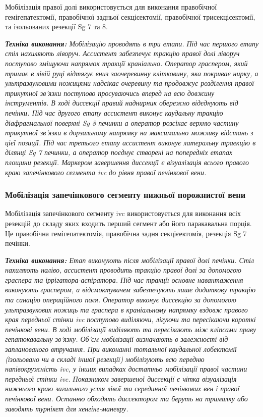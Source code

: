 \begin{refsection}
Мобілізація правої долі використовується для виконання правобічної гемігепатектомії, правобічної задньої секцієектомії, правобічної трисекцієектомії, та ізольованих резекції Sg 7 та 8.

\textit{ \textbf{Техніка виконання:} Мобілізацію проводять в три етапи. Під час першого етапу стіл нахиляють ліворуч. Ассистент забезпечує тракцію правої долі ліворуч поступово зміщуючи напрямок тракції краніально. Оператор граспером, який тримає в лівій руці відтягує вниз заочеревинну клітковину, яка покриває нирку, а ультразвуковими ножицями надсікає очеревину та продовжує розділення правої трикутної зв'язки поступово просуваючись вперед на всю довжину інструментів. В ході диссекції правий наднирник обережно відєднують від печінки. Під час другого етапу ассистент виконує каудальну тракцію діафрагмальної поверхні Sg 8 печинки а оператор розсікає верхню частину трикутної зв'язки в дорзальному напрямку на максимально можливу відстань з цієї позиції. Під час третього етапу ассистент виконує латеральну траекцію в ділянці Sg 7 печинки, а оператор поєднує створені на попередніх етапах площини резекції. Маркером завершення диссекції є візуалізація всього правого краю запечінкового сегмента \acrshort{ivc} до рівня правої печінкової вени.  
}

\subsubsection{Мобілізація запечінкового сегменту нижньої порожнистої вени}

Мобілізація запечінкового сегменту \acrshort{ivc} використовується для виконання всіх резекцій до складу яких входить перший сегмент або його паракавальна порція. Це правобічна гемігепатектомія, правобічна задня секцієектомія, резекція Sg 7 печінки.

\textit{ \textbf{Техніка виконання:}  Етап виконують після мобілізації правої долі печінки. Стіл нахиляють наліво, ассистент проводить тракцію правої долі за допомогою граспера та іррігатора-аспіратора. Під час тракції основне навантаження виконують граспером, а відсмоктувачем забезпечують лише додаткову тракцію та санацію операційного поля. Оператор виконує диссекцію за допомогою ультразвукових ножиць та граспера в краніальному напрямку вздовж правого края передньої стінки \acrshort{ivc} поступово виділяючи, лігуючи та пересікаючи короткі печінкові вени. В ході мобілізації виділяють та пересікають між кліпсами праву гепатокавальну зв'язку. Об'єм мобілізації визначають в залежності від запланованого втручання. При виконанні тотальної каудальної лобектомії (ізольовано чи в складі іншої резекції) мобілізують всю передню напівокружність \acrshort{ivc}, у інших випадках достатньо мобілізації правої частини передньої стінки \acrshort{ivc}. Показником завершеної диссекції є чітка візуалізація нижнього краю загального устя лівої та серединної печінкових вен і правої печінкової вени. Останню обходять диссектором та беруть на трималку або заводять турнікет для хенгінг-маневру. 
}


\end{refsection}

